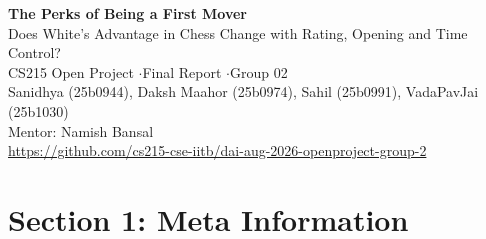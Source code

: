 \documentclass[11pt,a4paper]{article}
\begin{document}
\begin{center}
{\LARGE\bfseries The Perks of Being a First Mover}\\[4pt]
{\large Does White's Advantage in Chess Change with Rating, Opening and Time Control?}\\[6pt]
CS215 Open Project \quad$\cdot$\quad Final Report \quad$\cdot$\quad Group 02\\[2pt]
{\small Sanidhya (25b0944), Daksh Maahor (25b0974), Sahil (25b0991), VadaPavJai (25b1030)}\\[2pt]
{\small Mentor: Namish Bansal}\\[2pt]
{\small\url{https://github.com/cs215-cse-iitb/dai-aug-2026-openproject-group-2}}
\end{center}


\section*{Section 1: Meta Information}
\end{document}
